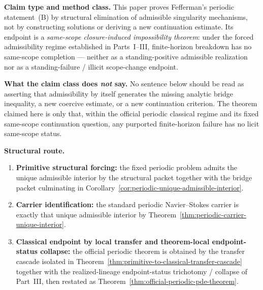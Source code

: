 \begin{tcolorbox}[title={Claim type and method class}, colback=green!2!white, colframe=green!45!black]
\textbf{Claim type and method class.}
This paper proves Fefferman's periodic statement~(B) by structural elimination of admissible singularity mechanisms, not by constructing solutions or deriving a new continuation estimate. Its endpoint is a \emph{same-scope closure-induced impossibility theorem}: under the forced admissibility regime established in Parts~I--III, finite-horizon breakdown has no same-scope completion --- neither as a standing-positive admissible realization nor as a standing-failure / illicit scope-change endpoint.

\medskip
\textbf{What the claim class does \emph{not} say.}
No sentence below should be read as asserting that admissibility by itself generates the missing analytic bridge inequality, a new coercive estimate, or a new continuation criterion. The theorem claimed here is only that, within the official periodic classical regime and its fixed same-scope continuation question, any purported finite-horizon failure has no licit same-scope status.

\medskip
\textbf{Structural route.}
\begin{enumerate}[leftmargin=1.8em, itemsep=0.15em, topsep=0.15em]
\item \textbf{Primitive structural forcing:} the fixed periodic problem admits the unique admissible interior by the structural packet \StructuralPacketRef{} together with the bridge packet culminating in Corollary~\ref{cor:periodic-unique-admissible-interior}.
\item \textbf{Carrier identification:} the standard periodic Navier--Stokes carrier is exactly that unique admissible interior by Theorem~\ref{thm:periodic-carrier-unique-interior}.
\item \textbf{Classical endpoint by local transfer and theorem-local endpoint-status collapse:} the official periodic theorem is obtained by the transfer cascade isolated in Theorem~\ref{thm:primitive-to-classical-transfer-cascade} together with the realized-lineage endpoint-status trichotomy / collapse of Part~III, then restated as Theorem~\ref{thm:official-periodic-pde-theorem}.
\end{enumerate}
\end{tcolorbox}

